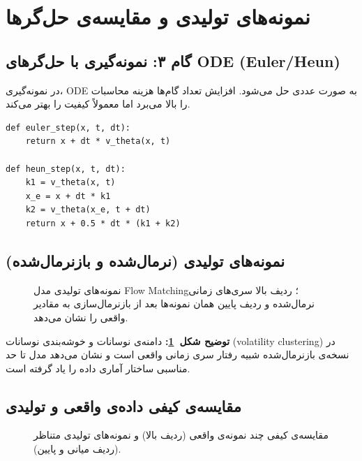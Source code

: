 \section{نمونه‌های تولیدی و مقایسه‌ی حل‌گرها}

\subsection{گام ۳: نمونه‌گیری با حل‌گرهای ODE (Euler/Heun)}
در نمونه‌گیری، ODE به صورت عددی حل می‌شود. افزایش تعداد گام‌ها هزینه محاسبات را بالا می‌برد اما معمولاً کیفیت را بهتر می‌کند.
\begin{verbatim}
def euler_step(x, t, dt):
	return x + dt * v_theta(x, t)

def heun_step(x, t, dt):
	k1 = v_theta(x, t)
	x_e = x + dt * k1
	k2 = v_theta(x_e, t + dt)
	return x + 0.5 * dt * (k1 + k2)
\end{verbatim}

\subsection{نمونه‌های تولیدی (نرمال‌شده و بازنرمال‌شده)}

\begin{figure}[H]
	\centering
	\caption{نمونه‌های تولیدی مدل Flow Matching؛ ردیف بالا سری‌های زمانی نرمال‌شده و ردیف پایین همان نمونه‌ها بعد از بازنرمال‌سازی به مقادیر  واقعی را نشان می‌دهد.}
	\label{fig:fm-gen}
\end{figure}

\noindent\textbf{توضیح شکل~\ref{fig:fm-gen}:}
دامنه‌ی نوسانات و خوشه‌بندی نوسانات (volatility clustering) در نسخه‌ی بازنرمال‌شده شبیه رفتار سری زمانی واقعی است و نشان می‌دهد مدل تا حد مناسبی ساختار آماری داده را یاد گرفته است.

\subsection{مقایسه‌ی کیفی داده‌ی واقعی و تولیدی}

\begin{figure}[H]
	\centering
	\caption{مقایسه‌ی کیفی چند نمونه‌ی واقعی (ردیف بالا) و نمونه‌های تولیدی متناظر (ردیف میانی و پایین).}
	\label{fig:fm-real-vs-gen}
\end{figure}

